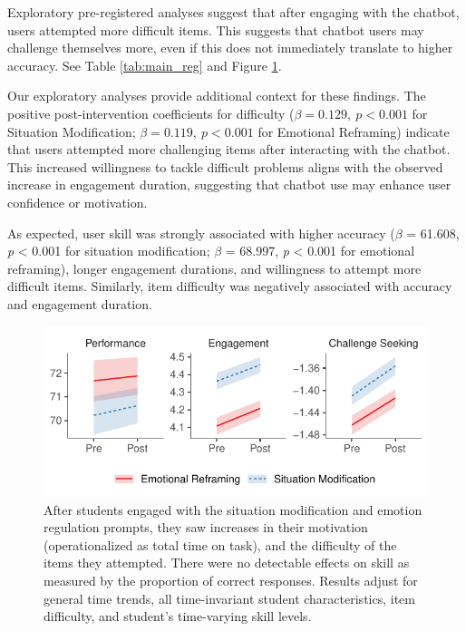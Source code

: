 \documentclass[11pt]{report}
\begin{document}
\begin{mainf}
Exploratory pre-registered analyses suggest that after engaging with the chatbot, users attempted more difficult items. 
This suggests that chatbot users may challenge themselves more, even if this does not immediately translate to higher accuracy. See Table \ref{tab:main_reg} and Figure \ref{fig:main}.

Our exploratory analyses provide additional context for these findings. 
The positive post-intervention coefficients for difficulty (\(\beta=0.129,\ p<0.001\) for Situation Modification; \(\beta=0.119,\ p<0.001\) for Emotional Reframing) indicate that users attempted more challenging items after interacting with the chatbot. 
This increased willingness to tackle difficult problems aligns with the observed increase in engagement duration, suggesting that chatbot use may enhance user confidence or motivation.

As expected, user skill was strongly associated with higher accuracy ($\beta$ = 61.608, \textit{p} < 0.001 for situation modification; $\beta$ = 68.997, \textit{p} < 0.001 for emotional reframing), longer engagement durations, and willingness to attempt more difficult items. 
Similarly, item difficulty was negatively associated with accuracy and engagement duration.

\begin{figure}
    \centering
    \includegraphics[width=\linewidth]{main.pdf}
    \caption{After students engaged with the situation modification and emotion regulation prompts, they saw increases in their motivation (operationalized as total time on task), and the difficulty of the items they attempted. 
    There were no detectable effects on skill as measured by the proportion of correct responses. 
    Results adjust for general time trends, all time-invariant student characteristics, item difficulty, and student's time-varying skill levels.}
    \label{fig:main}
\end{figure}


\end{mainf}
\end{document}
